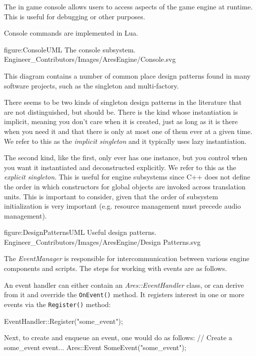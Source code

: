 \page
{}
The in game console allows users to access aspects of the game engine at runtime. This is useful for debugging or other purposes.

Console commands are implemented in Lua.

\FullPageDiagram
    {figure:ConsoleUML}
    {The console subsystem.}
    {Engineer_Contributors/Images/AresEngine/Console.svg}

\page
{}
This diagram contains a number of common place design patterns found in many software projects, such as the singleton and multi-factory. 

There seems to be two kinds of singleton design patterns in the literature that are not distinguished, but should be. There is the kind whose instantiation is implicit, meaning you don't care when it is created, just as long as it is there when you need it and that there is only at most one of them ever at a given time. We refer to this as the {\it implicit singleton} and it typically uses lazy instantiation.

The second kind, like the first, only ever has one instance, but you control when you want it instantiated and deconstructed explicitly. We refer to this as the {\it explicit singleton}. This is useful for engine subsystems since C++ does not define the order in which constructors for global objects are invoked across translation units. This is important to consider, given that the order of subsystem initialization is very important (e.g. resource management must precede audio management).

\FullPageDiagram
    {figure:DesignPatternsUML}
    {Useful design patterns.}
    {Engineer_Contributors/Images/AresEngine/Design Patterns.svg}

\page 
{}
The {\it EventManager} is responsible for intercommunication between various engine components and scripts. The steps for working with events are as follows.

An event handler can either contain an {\it Ares::EventHandler} class, or can derive from it and override the {\tt OnEvent()} method. It registers interest in one or more events via the {\tt Register()} method:

\startCodeExample
EventHandler::Register("some_event");
\stopCodeExample

Next, to create and enqueue an event, one would do as follows:
\startCodeExample
// Create a some_event event...
Ares::Event SomeEvent("some_event");

